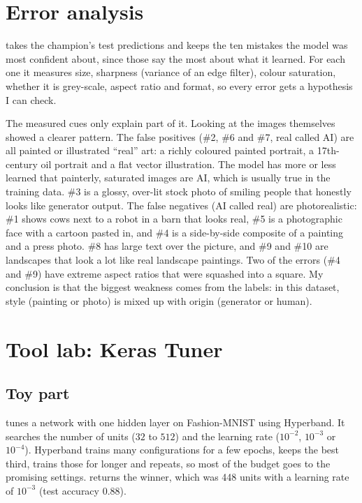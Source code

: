 \section{Error analysis}\label{sec:2-6}
 takes the champion's test predictions and keeps the ten mistakes
the model was most confident about, since those say the most about what it learned. For each one
it measures size, sharpness (variance of an edge filter), colour saturation, whether it is
grey-scale, aspect ratio and format, so every error gets a hypothesis I can check.


The measured cues only explain part of it. Looking at the images themselves showed a clearer
pattern. The false positives (\#2, \#6 and \#7, real called AI) are all painted or illustrated
``real'' art: a richly coloured painted portrait, a 17th-century oil portrait and a flat vector
illustration. The model has more or less learned that painterly, saturated images are AI, which is
usually true in the training data. \#3 is a glossy, over-lit stock photo of smiling people that
honestly looks like generator output. The false negatives (AI called real) are photorealistic:
\#1 shows cows next to a robot in a barn that looks real, \#5 is a photographic face with a cartoon
pasted in, and \#4 is a side-by-side composite of a painting and a press photo. \#8 has large text
over the picture, and \#9 and \#10 are landscapes that look a lot like real landscape paintings.
Two of the errors (\#4 and \#9) have extreme aspect ratios that were squashed into a square. My
conclusion is that the biggest weakness comes from the labels: in this dataset, style (painting or
photo) is mixed up with origin (generator or human).

\section{Tool lab: Keras Tuner}
\subsection*{Toy part}
 tunes a network with one hidden layer on Fashion-MNIST using Hyperband.
It searches the number of units ($32$ to $512$) and the learning rate ($10^{-2}$, $10^{-3}$ or
$10^{-4}$). Hyperband trains many configurations for a few epochs, keeps the best third, trains
those for longer and repeats, so most of the budget goes to the promising settings.
 returns the winner, which was 448 units with a learning rate
of $10^{-3}$ (test accuracy 0.88).

